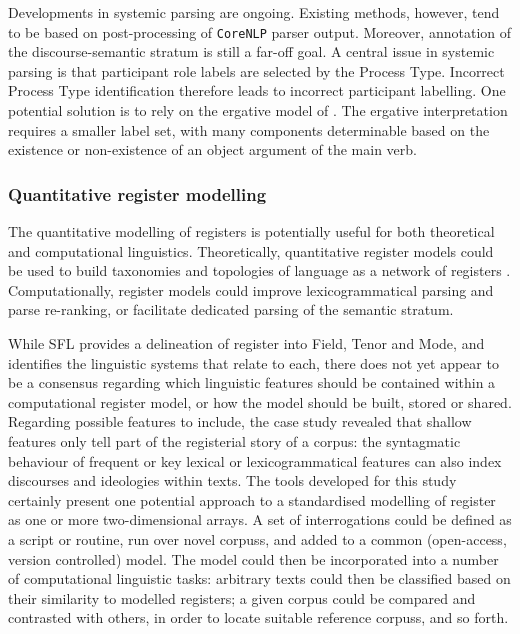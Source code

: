 \noindent Developments in systemic parsing are ongoing. Existing methods, however, tend to be based on post\hyp{}processing of \texttt{CoreNLP} parser output. Moreover, annotation of the \gls{discourse-semantic} stratum is still a far\hyp{}off goal. A central issue in systemic parsing is that participant role labels are selected by the Process Type. Incorrect Process Type identification therefore leads to incorrect participant labelling. One potential solution is to rely on the ergative model of . The ergative interpretation requires a smaller label set, with many components determinable based on the existence or non\hyp{}existence of an object argument of the main verb.

\subsubsection{Quantitative register modelling}

The quantitative modelling of registers is potentially useful for both theoretical and computational linguistics. Theoretically, quantitative register models could be used to build taxonomies and topologies of language as a network of registers \cite{matthiessen_modeling_2015}. Computationally, register models could improve lexicogrammatical parsing and parse re\hyp{}ranking, or facilitate dedicated parsing of the semantic stratum. 

While \gls{SFL} provides a delineation of register into Field, Tenor and \gls{Mode}, and identifies the linguistic systems that relate to each, there does not yet appear to be a consensus regarding which linguistic features should be contained within a computational register model, or how the model should be built, stored or shared. Regarding possible features to include, the case study revealed that shallow features only tell part of the registerial story of a \gls{corpus}: the syntagmatic behaviour of frequent or key lexical or lexicogrammatical features can also index discourses and ideologies within texts. The tools developed for this study certainly present one potential approach to a standardised modelling of register as one or more two-dimensional arrays. A set of interrogations could be defined as a script or routine, run over novel \glspl{corpus}, and added to a common (open-access, version controlled) model. The model could then be incorporated into a number of computational linguistic tasks: arbitrary texts could then be classified based on their similarity to modelled registers; a given \gls{corpus} could be compared and contrasted with others, in order to locate suitable reference \glspl{corpus}, and so forth.


